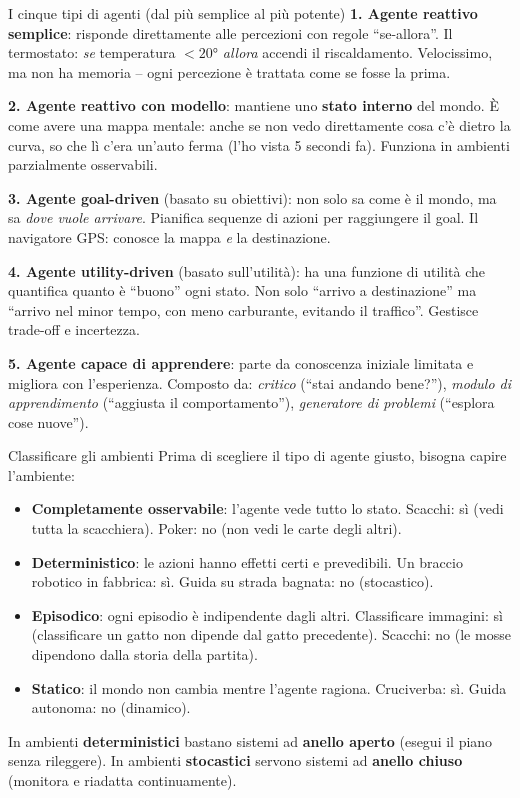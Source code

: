 \documentclass[12pt,a4paper]{article}
\begin{document}
\begin{narrativo}{I cinque tipi di agenti (dal più semplice al più potente)}
\textbf{1. Agente reattivo semplice}: risponde direttamente alle percezioni con regole ``se-allora''. Il termostato: \emph{se} temperatura $< 20°$ \emph{allora} accendi il riscaldamento. Velocissimo, ma non ha memoria -- ogni percezione è trattata come se fosse la prima.

\textbf{2. Agente reattivo con modello}: mantiene uno \textbf{stato interno} del mondo. È come avere una mappa mentale: anche se non vedo direttamente cosa c'è dietro la curva, so che lì c'era un'auto ferma (l'ho vista 5 secondi fa). Funziona in ambienti parzialmente osservabili.

\textbf{3. Agente goal-driven} (basato su obiettivi): non solo sa come è il mondo, ma sa \emph{dove vuole arrivare}. Pianifica sequenze di azioni per raggiungere il goal. Il navigatore GPS: conosce la mappa \emph{e} la destinazione.

\textbf{4. Agente utility-driven} (basato sull'utilità): ha una funzione di utilità che quantifica quanto è ``buono'' ogni stato. Non solo ``arrivo a destinazione'' ma ``arrivo nel minor tempo, con meno carburante, evitando il traffico''. Gestisce trade-off e incertezza.

\textbf{5. Agente capace di apprendere}: parte da conoscenza iniziale limitata e migliora con l'esperienza. Composto da: \emph{critico} (``stai andando bene?''), \emph{modulo di apprendimento} (``aggiusta il comportamento''), \emph{generatore di problemi} (``esplora cose nuove'').
\end{narrativo}

\begin{esempio}{Classificare gli ambienti}
Prima di scegliere il tipo di agente giusto, bisogna capire l'ambiente:
\begin{itemize}[noitemsep]
  \item \textbf{Completamente osservabile}: l'agente vede tutto lo stato. Scacchi: sì (vedi tutta la scacchiera). Poker: no (non vedi le carte degli altri).
  \item \textbf{Deterministico}: le azioni hanno effetti certi e prevedibili. Un braccio robotico in fabbrica: sì. Guida su strada bagnata: no (stocastico).
  \item \textbf{Episodico}: ogni episodio è indipendente dagli altri. Classificare immagini: sì (classificare un gatto non dipende dal gatto precedente). Scacchi: no (le mosse dipendono dalla storia della partita).
  \item \textbf{Statico}: il mondo non cambia mentre l'agente ragiona. Cruciverba: sì. Guida autonoma: no (dinamico).
\end{itemize}
In ambienti \textbf{deterministici} bastano sistemi ad \textbf{anello aperto} (esegui il piano senza rileggere). In ambienti \textbf{stocastici} servono sistemi ad \textbf{anello chiuso} (monitora e riadatta continuamente).
\end{esempio}
\end{document}
